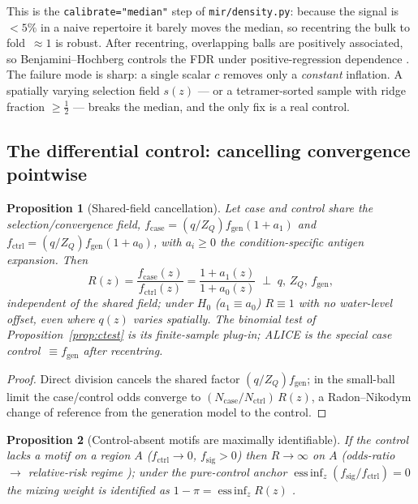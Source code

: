 \documentclass[11pt]{article}
\theoremstyle{oldplain}
\newtheorem{proposition}{Proposition}
\theoremstyle{oldrem}
\newcommand{\code}[1]{\texttt{#1}}
\begin{document}
This is the \code{calibrate="median"} step of \code{mir/density.py}: because the signal is $<\!5\%$ in a naive
repertoire it barely moves the median, so recentring the bulk to fold~$\approx1$ is robust. After recentring,
overlapping balls are positively associated, so Benjamini--Hochberg controls the {\scshape FDR} under
positive-regression dependence \cite{BenjaminiHochberg1995,BenjaminiYekutieli2001}. The failure mode is
sharp: a single scalar $c$ removes only a \emph{constant} inflation. A spatially varying selection field
$s(z)$ --- or a tetramer-sorted sample with ridge fraction $\ge\tfrac12$ --- breaks the median, and the only
fix is a real control.

\subsection{The differential control: cancelling convergence pointwise}\label{sec:dens-diff}

\begin{proposition}[Shared-field cancellation]\label{prop:diffcancel}
Let case and control share the selection/convergence field,
$f_{\mathrm{case}}=(q/Z_Q)f_{\mathrm{gen}}(1+a_1)$ and $f_{\mathrm{ctrl}}=(q/Z_Q)f_{\mathrm{gen}}(1+a_0)$,
with $a_i\ge0$ the condition-specific antigen expansion. Then
\begin{equation}\label{eq:diff}
  R(z)=\frac{f_{\mathrm{case}}(z)}{f_{\mathrm{ctrl}}(z)}=\frac{1+a_1(z)}{1+a_0(z)}
  \;\perp\; q,\,Z_Q,\,f_{\mathrm{gen}},
\end{equation}
independent of the shared field; under $H_0$ ($a_1\equiv a_0$) $R\equiv1$ with \emph{no} water-level offset,
even where $q(z)$ varies spatially. The binomial test of Proposition~\ref{prop:ctest} is its finite-sample
plug-in; {\scshape ALICE} is the special case control~$\equiv f_{\mathrm{gen}}$ after recentring.
\end{proposition}
\begin{proof}
Direct division cancels the shared factor $(q/Z_Q)f_{\mathrm{gen}}$; in the small-ball limit the
case/control odds converge to $(N_{\mathrm{case}}/N_{\mathrm{ctrl}})\,R(z)$, a Radon--Nikodym change of
reference from the generation model to the control.
\end{proof}

\begin{proposition}[Control-absent motifs are maximally identifiable]\label{prop:absent}
If the control lacks a motif on a region $A$ ($f_{\mathrm{ctrl}}\to0$, $f_{\mathrm{sig}}>0$) then
$R\to\infty$ on $A$ (odds-ratio $\to$ relative-risk regime \cite{Cornfield1951}); under the pure-control
anchor $\operatorname{ess\,inf}_z(f_{\mathrm{sig}}/f_{\mathrm{ctrl}})=0$ the mixing weight is identified as
$1-\pi=\operatorname{ess\,inf}_z R(z)$ \cite{Blanchard2010}.
\end{proposition}
\end{document}
